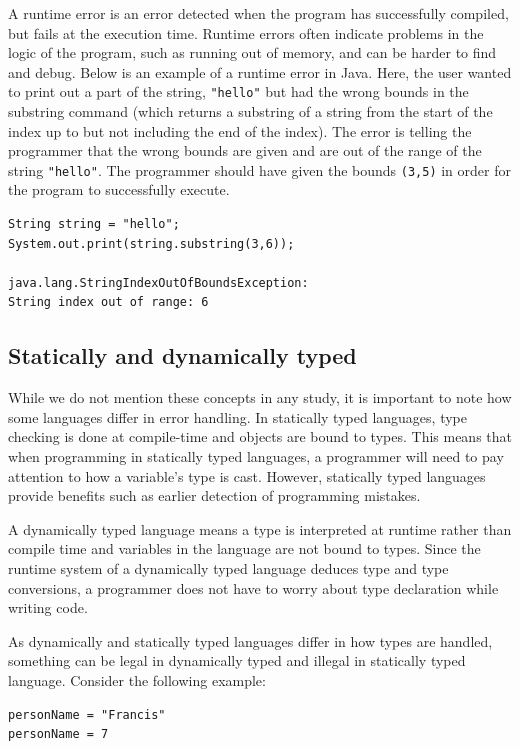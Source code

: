 \documentclass{sig-alternate}
\begin{document}
A runtime error is an error detected when the program has successfully compiled, but fails at the execution time.
Runtime errors often indicate problems in the logic of the program, such as running out of memory, and can be harder to find and debug.
Below is an example of a runtime error in Java.
Here, the user wanted to print out a part of the string, \texttt{"hello"} but had the wrong bounds in the substring command (which returns a substring of a string from the start of the index up to but not including the end of the index).
The error is telling the programmer that the wrong bounds are given and are out of the range of the string \texttt{"hello"}.
The programmer should have given the bounds \texttt{(3,5)} in order for the program to successfully execute.
\begin{verbatim}
String string = "hello";
System.out.print(string.substring(3,6));

java.lang.StringIndexOutOfBoundsException:
String index out of range: 6
\end{verbatim}
\subsection{Statically and dynamically typed}\label{subsec:typed}

While we do not mention these concepts in any study, it is important to note how some languages differ in error handling.
In statically typed languages, type checking is done at compile-time and objects are bound to types. 
This means that when programming in statically typed languages, a programmer will need to pay attention to how a variable's type is cast.
However, statically typed languages provide benefits such as earlier detection of programming mistakes.

A dynamically typed language means a type is interpreted at runtime rather than compile time and variables in the language are not bound to types.
Since the runtime system of a dynamically typed language deduces type and type conversions, a programmer does not have to worry about type declaration while writing code.

As dynamically and statically typed languages differ in how types are handled, something can be legal in dynamically typed and illegal in statically typed language.
Consider the following example:

\begin{verbatim}
personName = "Francis"
personName = 7
\end{verbatim}
\end{document}
